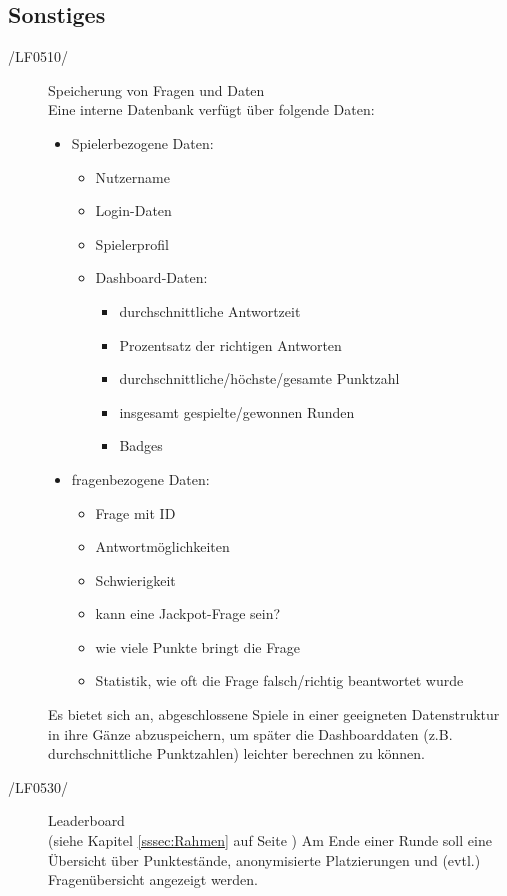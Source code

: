 \documentclass[11pt,a4paper]{scrreprt}
\begin{document}
\subsection{Sonstiges}
\begin{description}
\item[/LF0510/] Speicherung von Fragen und Daten \\
Eine interne Datenbank verfügt über folgende Daten:
	\begin{itemize}
	\item Spielerbezogene Daten:
		\begin{itemize}
		\item Nutzername
		\item Login-Daten
		\item Spielerprofil
		\item Dashboard-Daten:
			\begin{itemize}
			\item durchschnittliche Antwortzeit
			\item Prozentsatz der richtigen Antworten
			\item durchschnittliche/höchste/gesamte Punktzahl
			\item insgesamt gespielte/gewonnen Runden
			\item Badges
			\end{itemize}
		\end{itemize}
	\item fragenbezogene Daten:
		\begin{itemize}
		\item Frage mit ID
		\item Antwortmöglichkeiten
		\item Schwierigkeit
		\item kann eine Jackpot-Frage sein?
		\item wie viele Punkte bringt die Frage
		\item Statistik, wie oft die Frage falsch/richtig beantwortet wurde
		\end{itemize}
	\end{itemize}
Es bietet sich an, abgeschlossene Spiele in einer geeigneten Datenstruktur in ihre Gänze abzuspeichern, um später die Dashboarddaten (z.B. durchschnittliche Punktzahlen) leichter berechnen zu können.
\end{description}

\begin{description}


\item[/LF0530/] Leaderboard \\
(siehe Kapitel \ref{sssec:Rahmen} auf Seite \pageref{sssec:Rahmen}) Am Ende einer Runde soll eine Übersicht über Punktestände, anonymisierte Platzierungen und (evtl.) Fragenübersicht angezeigt werden.
\end{description}
\end{document}
